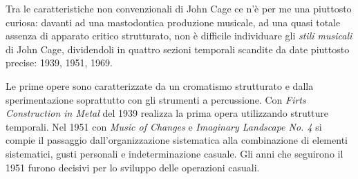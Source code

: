 Tra le caratteristiche non convenzionali di John Cage ce n'\`e per me una piuttosto
curiosa: davanti ad una mastodontica produzione musicale, ad una quasi totale
assenza di apparato critico strutturato, non \`e difficile individuare gli
\emph{stili musicali} di John Cage, dividendoli in quattro sezioni temporali
scandite da date piuttosto precise: 1939, 1951, 1969.

Le prime opere sono caratterizzate da un cromatismo strutturato e dalla
sperimentazione soprattutto con gli strumenti a percussione.
Con \emph{Firts Construction in Metal} del 1939 realizza la prima opera
utilizzando strutture temporali. Nel 1951 con \emph{Music of Changes} e
\emph{Imaginary Landscape No. 4} si compie il passaggio dall'organizzazione
sistematica alla combinazione di elementi sistematici, gusti personali e
indeterminazione casuale. Gli anni che seguirono il 1951 furono decisivi per
lo sviluppo delle operazioni casuali.

